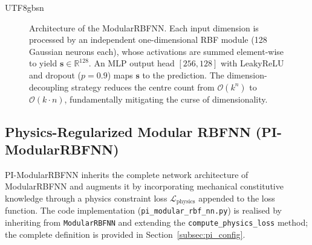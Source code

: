\documentclass[a4paper,12pt]{report}
\newcommand{\Lphys}{\mathcal{L}_{\text{physics}}}
\begin{document}
\begin{CJK}{UTF8}{gbsn}
\begin{figure}[H]
\caption{Architecture of the ModularRBFNN. Each input dimension is processed by an
independent one-dimensional RBF module (128 Gaussian neurons each), whose activations are
summed element-wise to yield $\mathbf{s}\in\mathbb{R}^{128}$. An MLP output head
$[256,128]$ with LeakyReLU and dropout ($p=0.9$) maps $\mathbf{s}$ to the prediction.
The dimension-decoupling strategy reduces the centre count from $\mathcal{O}(k^n)$ to
$\mathcal{O}(k\cdot n)$, fundamentally mitigating the curse of dimensionality.}
\label{fig:modular_rbf}
\end{figure}

\subsection{Physics-Regularized Modular RBFNN (PI-ModularRBFNN)}
\label{subsec:pi_modular}

PI-ModularRBFNN inherits the complete network architecture of ModularRBFNN and
augments it by incorporating mechanical constitutive knowledge through a physics
constraint loss $\Lphys$ appended to the loss function. The code implementation
(\texttt{pi\_modular\_rbf\_nn.py}) is realised by inheriting from \texttt{ModularRBFNN}
and extending the \texttt{compute\_physics\_loss} method; the complete definition
is provided in Section~\ref{subsec:pi_config}.


\end{CJK}
\end{document}
